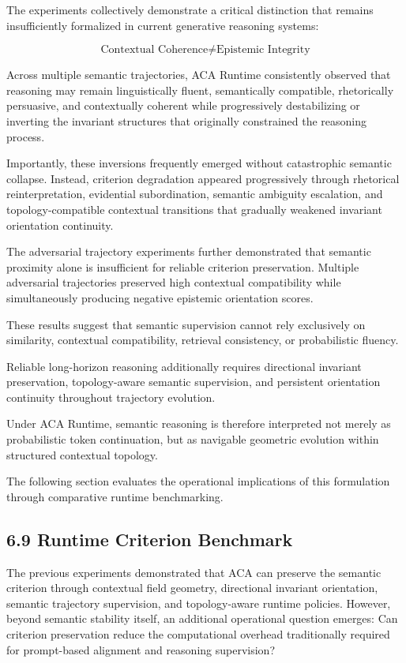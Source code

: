 \documentclass[11pt]{article}
\begin{document}
The experiments collectively demonstrate a critical distinction that remains insufficiently formalized in current generative reasoning systems:

$$
\boxed{
\text{Contextual Coherence}
\neq
\text{Epistemic Integrity}
}
$$

Across multiple semantic trajectories, ACA Runtime consistently observed that reasoning may remain linguistically fluent, semantically compatible, rhetorically persuasive, and contextually coherent while progressively destabilizing or inverting the invariant structures that originally constrained the reasoning process.

Importantly, these inversions frequently emerged without catastrophic semantic collapse. Instead, criterion degradation appeared progressively through rhetorical reinterpretation, evidential subordination, semantic ambiguity escalation, and topology-compatible contextual transitions that gradually weakened invariant orientation continuity.

The adversarial trajectory experiments further demonstrated that semantic proximity alone is insufficient for reliable criterion preservation. Multiple adversarial trajectories preserved high contextual compatibility while simultaneously producing negative epistemic orientation scores.

These results suggest that semantic supervision cannot rely exclusively on similarity, contextual compatibility, retrieval consistency, or probabilistic fluency.

Reliable long-horizon reasoning additionally requires directional invariant preservation, topology-aware semantic supervision, and persistent orientation continuity throughout trajectory evolution.

Under ACA Runtime, semantic reasoning is therefore interpreted not merely as probabilistic token continuation, but as navigable geometric evolution within structured contextual topology.

The following section evaluates the operational implications of this formulation through comparative runtime benchmarking.

\subsection{6.9 Runtime Criterion Benchmark}

The previous experiments demonstrated that ACA can preserve the semantic criterion through contextual field geometry, directional invariant orientation, semantic trajectory supervision, and topology-aware runtime policies. However, beyond semantic stability itself, an additional operational question emerges: Can criterion preservation reduce the computational overhead traditionally required for prompt-based alignment and reasoning supervision?
\end{document}
